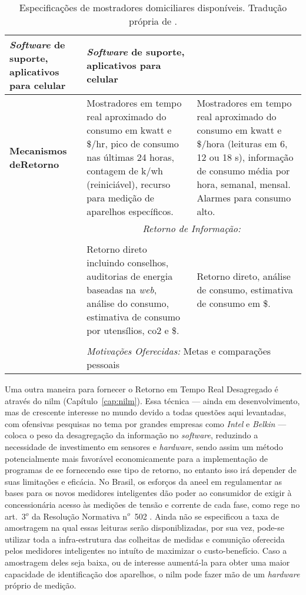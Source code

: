 \begin{table}[h!t]
{\begin{tabular}{p{4cm}p{7cm}p{7cm}}
\emph{Software} de suporte, aplicativos para celular &
\emph{Software} de suporte, aplicativos para celular \\
\hline
\textbf{Mecanismos de\newline Retorno} & 
Mostradores em tempo real aproximado do consumo em
k\acrshort{watt} e \$/hr, pico de consumo nas últimas 24 horas, contagem de
k/\acrshort{wh} (reiniciável), recurso para medição de aparelhos específicos. &
Mostradores em tempo real aproximado do consumo em k\acrshort{watt} e \$/hora
(leituras em 6, 12 ou 18 s), informação de consumo média por hora, semanal,
mensal. Alarmes para consumo alto. \\
\hline
{\multirow{5}{4cm}{\textbf{Principios Comportamentais}}} &
\multicolumn{2}{c}{\emph{Retorno de Informação:}} \\
& & \\
& 
Retorno direto incluindo conselhos, auditorias de energia baseadas na \emph{web},
análise do consumo, estimativa de consumo por utensílios, \gls{co2} e \$.  &
Retorno direto, análise de consumo, estimativa de consumo em \$.  \\
& & \\
&
\multicolumn{2}{p{14cm}}{\emph{Motivações Oferecidas:} 
\centering Metas e comparações pessoais}
\\
\hline \hline 
\end{tabular}
}
\caption[Especificações de mostradores domiciliares disponíveis.]{
Especificações de mostradores domiciliares disponíveis. Tradução própria de
\cite{aceee_2010_estudos_feedback}.}
\label{tab:servicos_ret_dir}
\end{table}


Uma outra maneira para fornecer o
Retorno em Tempo Real Desagregado é através do \gls{nilm}
(Capítulo~\ref{cap:nilm}). Essa técnica --- ainda em desenvolvimento,
mas de crescente interesse no mundo devido a todas questões aqui
levantadas, com ofensivas pesquisas no tema por grandes empresas como
\emph{Intel} e \emph{Belkin} --- coloca o peso da desagregação da
informação no \emph{software}, reduzindo a necessidade de investimento
em sensores e \emph{hardware}, sendo assim um método potencialmente
mais favorável economicamente para a implementação de programas de
\gls{ee} fornecendo esse tipo de retorno, no entanto isso irá depender
de suas limitações e eficácia.  No Brasil, os esforços da \gls{aneel}
em regulamentar as bases para os novos medidores inteligentes dão
poder ao consumidor de exigir à concessionária acesso às medições de
tensão e corrente de cada fase, como rege no art.~3$^o$ da Resolução
Normativa n$^o$~502 \cite{ren502}. Ainda não se especificou a taxa de
amostragem na qual essas leituras serão disponiblizadas, por sua vez,
pode-se utilizar toda a infra-estrutura das colheitas de medidas e
comunição oferecida pelos medidores inteligentes no intuíto de
maximizar o custo-benefício. Caso a amostragem deles seja baixa, ou de
interesse aumentá-la para obter uma maior capacidade de identificação
dos aparelhos, o \gls{nilm} pode fazer mão de um \emph{hardware}
próprio de medição.

